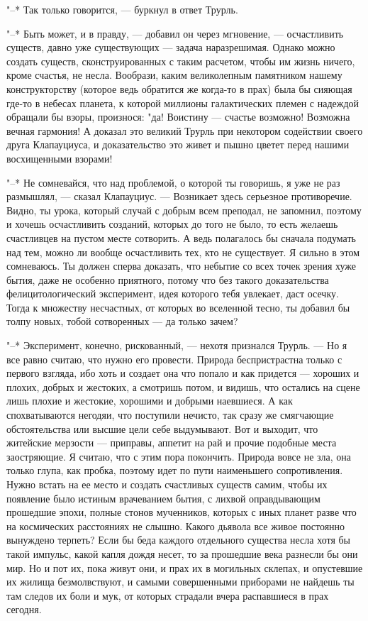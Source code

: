 "--* Так только говорится, --- буркнул в ответ Трурль.

"--* Быть может, и в правду, --- добавил он через мгновение, --- осчастливить
существ, давно уже существующих --- задача
наразрешимая. Однако можно создать существ,
сконструированных с таким расчетом, чтобы им жизнь ничего,
кроме счастья, не несла. Вообрази, каким великолепным
памятником нашему конструкторству (которое ведь обратится же
когда-то в прах) была бы сияющая где-то в небесах планета, к
которой миллионы галактических племен с надеждой обращали бы
взоры, произнося: "да! Воистину --- счастье возможно! Возможна
вечная гармония! А доказал это великий Трурль при некотором
содействии своего друга Клапауциуса, и доказательство это
живет и пышно цветет перед нашими восхищенными взорами!

"--* Не сомневайся, что над проблемой, о которой ты
говоришь, я уже не раз размышлял, --- сказал Клапауциус. --- Возникает
здесь серьезное противоречие. Видно, ты урока,
который случай с добрым всем преподал, не запомнил, поэтому
и хочешь осчастливить созданий, которых до того не было, то
есть желаешь счастливцев на пустом месте сотворить. А ведь
полагалось бы сначала подумать над тем, можно ли вообще
осчастливить тех, кто не существует. Я сильно в этом
сомневаюсь. Ты должен сперва доказать, что небытие со всех
точек зрения хуже бытия, даже не особенно приятного, потому
что без такого доказательства фелицитологический
эксперимент, идея которого тебя увлекает, даст осечку. Тогда
к множеству несчастных, от которых во вселенной тесно, ты
добавил бы толпу новых, тобой сотворенных --- да только зачем?

"--* Эксперимент, конечно, рискованный, --- нехотя признался
Трурль. --- Но  я все равно считаю, что  нужно его провести.
Природа беспристрастна только с  первого взгляда, ибо хоть и
создает  она  что  попало  и  как  придется  ---  хороших  и
плохих, добрых и  жестоких, а смотришь потом,  и видишь, что
остались на сцене лишь плохие и жестокие, хорошими и добрыми
наевшиеся.  А  как  спохватываются  негодяи,  что  поступили
нечисто, так  сразу же смягчающие обстоятельства  или высшие
цели себе выдумывают. Вот  и выходит, что житейские мерзости
---  приправы,  аппетит  на  рай  и  прочие  подобные  места
заостряющие. Я  считаю, что  с этим пора  покончить. Природа
вовсе не зла, она только  глупа, как пробка, поэтому идет по
пути наименьшего  сопротивления. Нужно встать на  ее место и
создать счастливых  существ самим,  чтобы их  появление было
истиным врачеванием бытия,  с лихвой оправдывающим прошедшие
эпохи, полные стонов мученников, которых с иных планет разве
что на космических расстояниях не слышно. Какого дьявола все
живое  постоянно вынуждено  терпеть?  Если  бы беда  каждого
отдельного существа несла хотя бы такой импульс, какой капля
дождя несет, то за прошедшие века  разнесли бы они мир. Но и
пот их,  пока живут они,  и прах  их в могильных  склепах, и
опустевшие  их жилища  безмолвствуют, и  самыми совершенными
приборами не найдешь ты там следов их боли и мук, от которых
страдали вчера распавшиеся в прах сегодня.

